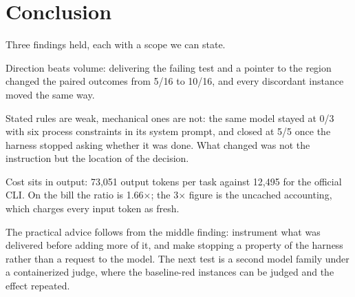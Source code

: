\section{Conclusion}

Three findings held, each with a scope we can state.

Direction beats volume: delivering the failing test and a pointer to the region changed the paired outcomes from 5/16 to 10/16, and every discordant instance moved the same way.

Stated rules are weak, mechanical ones are not: the same model stayed at 0/3 with six process constraints in its system prompt, and closed at 5/5 once the harness stopped asking whether it was done. What changed was not the instruction but the location of the decision.

Cost sits in output: 73,051 output tokens per task against 12,495 for the official CLI. On the bill the ratio is 1.66$\times$; the 3$\times$ figure is the uncached accounting, which charges every input token as fresh.

The practical advice follows from the middle finding: instrument what was delivered before adding more of it, and make stopping a property of the harness rather than a request to the model. The next test is a second model family under a containerized judge, where the baseline-red instances can be judged and the effect repeated.

